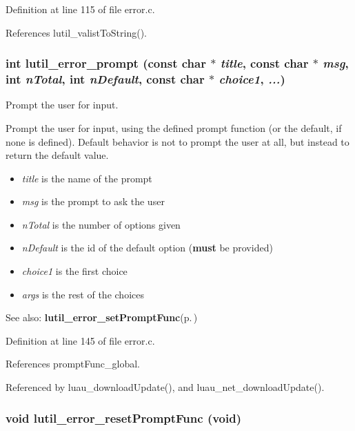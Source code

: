 Definition at line 115 of file error.c.

References lutil\_\-valist\-To\-String().
\subsubsection{\setlength{\rightskip}{0pt plus 5cm}int lutil\_\-error\_\-prompt (const char $\ast$ {\em title}, const char $\ast$ {\em msg}, int {\em n\-Total}, int {\em n\-Default}, const char $\ast$ {\em choice1},  {\em ...})}\label{error_8c_a6}


Prompt the user for input. 

Prompt the user for input, using the defined prompt function (or the default, if none is defined). Default behavior is not to prompt the user at all, but instead to return the default value.

\begin{itemize}
\item {\em title\/} is the name of the prompt \item {\em msg\/} is the prompt to ask the user \item {\em n\-Total\/} is the number of options given \item {\em n\-Default\/} is the id of the default option ({\bf must} be provided) \item {\em choice1\/} is the first choice \item {\em args\/} is the rest of the choices\end{itemize}
\begin{Desc}
\item[See also:]{\bf lutil\_\-error\_\-set\-Prompt\-Func}{\rm (p.\,\pageref{error_8h_a5})} \end{Desc}


Definition at line 145 of file error.c.

References prompt\-Func\_\-global.

Referenced by luau\_\-download\-Update(), and luau\_\-net\_\-download\-Update().
\subsubsection{\setlength{\rightskip}{0pt plus 5cm}void lutil\_\-error\_\-reset\-Prompt\-Func (void)}\label{error_8c_a4}


